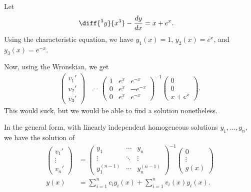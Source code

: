 \documentclass[10pt]{mypackage}
\begin{document}
\begin{example}
  Let
  \begin{align*}
    \diff{^3y}{x^3} - \frac{dy}{dx} &= x + e^{x}.
  \end{align*}
  Using the characteristic equation, we have $y_1(x) = 1$, $y_2(x) = e^x$, and $y_3(x) = e^{-x}$.\newline

  Now, using the Wronskian, we get
  \begin{align*}
    \begin{pmatrix}v_1' \\ v_2' \\ v_3'\end{pmatrix} &= \begin{pmatrix}1 & e^x & e^{-x} \\ 0 & e^x & -e^{-x} \\ 0 & e^{x} & e^{-x}\end{pmatrix}^{-1} \begin{pmatrix}0\\0\\x + e^{x}\end{pmatrix}.
  \end{align*}
  This would suck, but we would be able to find a solution nonetheless.
\end{example}
In the general form, with linearly independent homogeneous solutions $y_1,\dots,y_n$, we have the solution of
\begin{align*}
  \begin{pmatrix}v_1' \\ \vdots \\ v_n'\end{pmatrix} &= \begin{pmatrix}y_1 & \cdots & y_n \\ \vdots & \ddots & \vdots \\ y_1^{(n-1)} & \cdots & y_n^{(n-1)}\end{pmatrix}^{-1} \begin{pmatrix}0 \\ \vdots \\ g(x)\end{pmatrix}\\
  y(x) &= \sum_{i=1}^{n}c_iy_i(x) + \sum_{i=1}^{n}v_i(x)y_i(x).
\end{align*}
\end{document}
